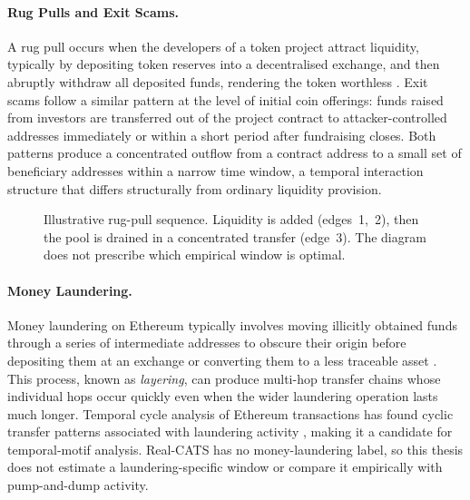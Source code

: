 \documentclass{thesisclass}
\begin{document}
\paragraph{Rug Pulls and Exit Scams.}
A rug pull occurs when the developers of a token project attract liquidity, typically by depositing token reserves into a decentralised exchange, and then abruptly withdraw all deposited funds, rendering the token worthless \citep{hornuf2025cybercrime, xia2021rugpull}. Exit scams follow a similar pattern at the level of initial coin offerings: funds raised from investors are transferred out of the project contract to attacker-controlled addresses immediately or within a short period after fundraising closes. Both patterns produce a concentrated outflow from a contract address to a small set of beneficiary addresses within a narrow time window, a temporal interaction structure that differs structurally from ordinary liquidity provision.

\begin{figure}[ht]
  \centering
  \caption[Rug pull transfer sequence]{Illustrative rug-pull sequence. Liquidity is
    added (edges~1,~2), then the pool is drained in a concentrated transfer
    (edge~3). The diagram does not prescribe which empirical window is optimal.}
  \label{fig:motif-rugpull}
\end{figure}

\paragraph{Money Laundering.}
Money laundering on Ethereum typically involves moving illicitly obtained funds through a series of intermediate addresses to obscure their origin before depositing them at an exchange or converting them to a less traceable asset \citep{lal2021money}. This process, known as \emph{layering}, can produce multi-hop transfer chains whose individual hops occur quickly even when the wider laundering operation lasts much longer. Temporal cycle analysis of Ethereum transactions has found cyclic transfer patterns associated with laundering activity \citep{lal2021money}, making it a candidate for temporal-motif analysis. Real-CATS has no money-laundering label, so this thesis does not estimate a laundering-specific window or compare it empirically with pump-and-dump activity.
\end{document}
